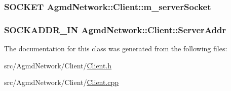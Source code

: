 \hypertarget{class_agmd_network_1_1_client_abf2e8692a26e29cfc09c265c55fb88b5}{
\subsubsection[{m\+\_\+server\+Socket}]{\setlength{\rightskip}{0pt plus 5cm}S\+O\+C\+K\+E\+T Agmd\+Network\+::\+Client\+::m\+\_\+server\+Socket\hspace{0.3cm}{\ttfamily [protected]}}}\label{class_agmd_network_1_1_client_abf2e8692a26e29cfc09c265c55fb88b5}
\hypertarget{class_agmd_network_1_1_client_a28423b5e61474fd608cf45b9d8b529b0}{
\subsubsection[{Server\+Addr}]{\setlength{\rightskip}{0pt plus 5cm}S\+O\+C\+K\+A\+D\+D\+R\+\_\+\+I\+N Agmd\+Network\+::\+Client\+::\+Server\+Addr\hspace{0.3cm}{\ttfamily [protected]}}}\label{class_agmd_network_1_1_client_a28423b5e61474fd608cf45b9d8b529b0}


The documentation for this class was generated from the following files\+:\begin{DoxyCompactItemize}
\item 
src/\+Agmd\+Network/\+Client/\hyperlink{_client_8h}{Client.\+h}\item 
src/\+Agmd\+Network/\+Client/\hyperlink{_client_8cpp}{Client.\+cpp}\end{DoxyCompactItemize}
